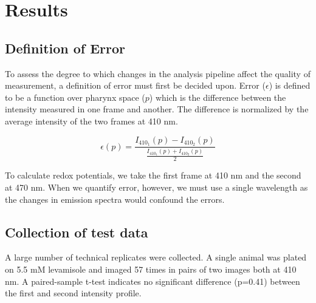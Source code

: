
\chapter{Results} %

\label{Chapter3} %

\section{Definition of Error}
To assess the degree to which changes in the analysis pipeline affect the quality of measurement, a definition of error must first be decided upon. Error ($\epsilon$) is defined to be a function over pharynx space ($p$) which is the difference between the intensity measured in one frame and another. The difference is normalized by the average intensity of the two frames at 410 nm.


\[\epsilon(p) = \frac{I_{410_1}(p) - I_{410_2}(p)}{\frac{I_{410_1}(p) + I_{410_2}(p)}{2}}\]

To calculate redox potentials, we take the first frame at 410 nm and the second at 470 nm. When we quantify error, however, we must use a single wavelength as the changes in emission spectra would confound the errors.

\section{Collection of test data} \label{testCollection}

A large number of technical replicates were collected. A single animal was plated on 5.5 mM levamisole and imaged 57 times in pairs of two images both at 410 nm. A paired-sample t-test indicates no significant difference (p=0.41) between the first and second intensity profile.

